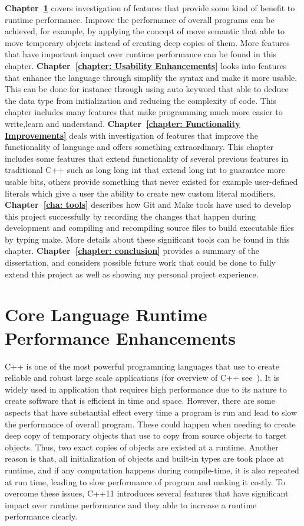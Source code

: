 \documentclass[11pt]{report}
\begin{document}
\textbf{Chapter~\ref{chapter: Runtime Performance Enhancements}} covers investigation of  features that provide some kind of benefit to runtime performance. Improve the performance of overall programs  can be achieved, for example, by applying the concept of move semantic that able to move temporary objects instead of creating deep copies of them. More  features that have important impact over runtime performance can be found in this chapter. \textbf{Chapter~\ref{chapter: Usability Enhancements}} looks into features  that enhance the language through simplify the syntax  and make it more usable. This can be done for instance through using auto keyword that able to deduce the data type from initialization and reducing the complexity of code. This chapter includes many features that make programming much more easier to write,learn and understand. \textbf{Chapter~\ref{chapter: Functionality Improvements}} deals with investigation of features that improve the functionality of language and offers something extraordinary. This chapter includes some features that extend functionality of several previous features in traditional C++  such as long long int that extend long int to guarantee more usable bits, others provide something that never existed for example user-defined literals which give a user the ability to create new custom literal modifiers. \textbf{Chapter~\ref{cha: tools}} describes how Git and Make tools have used to develop this project successfully by recording the changes that happen during development and compiling and recompiling source files to build executable files by typing make. More details about these significant tools can be found in this chapter. \textbf{Chapter~\ref{chapter: conclusion}} provides a summary of the dissertation, and considers possible future work that could be done to fully extend this project  as well as showing my personal project experience.


\chapter{Core Language Runtime Performance Enhancements}
\label{chapter: Runtime Performance Enhancements}
C++ is one of the most powerful programming languages that use to create reliable and robust large scale applications (for overview of C++ see~\cite{Stroustrup:2012:Cpp11}). It is widely used in application that requires high performance due to its nature to create software that is efficient in time and space. However, there are some aspects that have substantial effect every time a program is run and lead to slow the performance of overall program. These could happen when needing to create deep copy of temporary objects that use to copy from source objects to target objects. Thus, two exact copies of objects are existed at a runtime. Another reason is that, all initialization of objects and built-in types are took place at runtime, and if any computation happens during compile-time, it is also repeated at run time, leading to slow performance of program and making it costly. To overcome these issues, C++11 introduces several features that have significant impact over runtime performance and they able to increase a runtime performance clearly.
\end{document}
